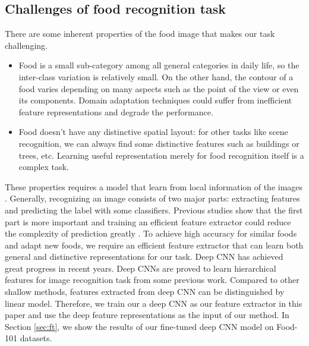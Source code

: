 \subsection{Challenges of food recognition task}
There are some inherent properties of the food image that makes our task challenging.
\begin{itemize}
 \item Food is a small sub-category among all general categories in daily life, so the inter-class variation is relatively small. On the other hand, the contour of a food varies depending on many aspects such as the point of the view or even its components. Domain adaptation techniques could suffer from inefficient feature representations and degrade the performance.
  \item Food doesn't have any distinctive spatial layout: for other tasks like scene recognition, we can always find some distinctive features such as buildings or trees, etc. Learning useful representation merely for food recognition itself is a complex task.
\end{itemize}
These properties requires a model that learn from local information of the images \cite{bossard2014food}. Generally, recognizing an image consists of two major parts: extracting features and predicting the label with some classifiers. Previous studies show that the first part is more important and training an efficient feature extractor could reduce the complexity of prediction greatly\cite{zeiler2014visualizing} \cite{simonyan2014very}. To achieve high accuracy for similar foods and adapt new foods, we require an efficient feature extractor that can learn both general and distinctive representations for our task. Deep CNN has achieved great progress in recent years. Deep CNNs are proved to learn hierarchical features for image recognition task from some previous work\cite{zeiler2010deconvolutional}\cite{krizhevsky2012imagenet}\cite{CiresanIJCAI11}. Compared to other shallow methods, features extracted from deep CNN can be distinguished by linear model. Therefore, we train our a deep CNN as our feature extractor in this paper and use the deep feature representations as the input of our method. In Section \ref{sec:ft}, we show the results of our fine-tuned deep CNN model on Food-101 datasets. 